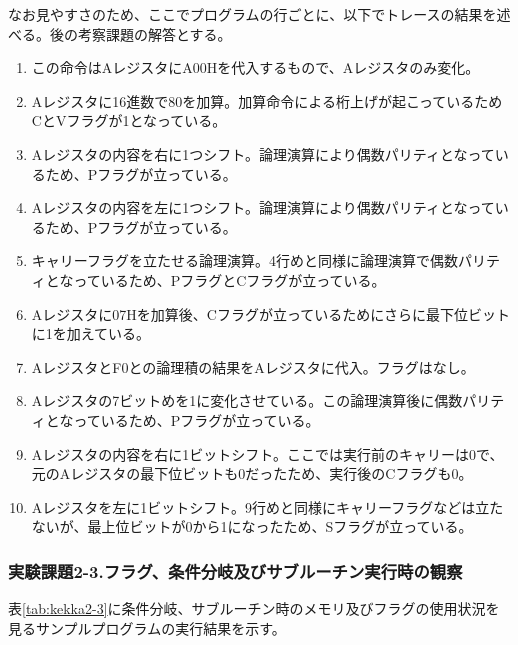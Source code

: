 \documentclass[11pt,a4j]{jsarticle}
\begin{document}
   なお見やすさのため、ここでプログラムの行ごとに、以下でトレースの結果を述べる。後の考察課題の解答とする。
   \begin{enumerate}
   \item この命令はAレジスタにA00Hを代入するもので、Aレジスタのみ変化。
   \item Aレジスタに16進数で80を加算。加算命令による桁上げが起こっているためCとVフラグが1となっている。
   \item Aレジスタの内容を右に1つシフト。論理演算により偶数パリティとなっているため、Pフラグが立っている。
   \item Aレジスタの内容を左に1つシフト。論理演算により偶数パリティとなっているため、Pフラグが立っている。
   \item キャリーフラグを立たせる論理演算。4行めと同様に論理演算で偶数パリティとなっているため、PフラグとCフラグが立っている。
   \item Aレジスタに07Hを加算後、Cフラグが立っているためにさらに最下位ビットに1を加えている。
   \item AレジスタとF0との論理積の結果をAレジスタに代入。フラグはなし。
   \item Aレジスタの7ビットめを1に変化させている。この論理演算後に偶数パリティとなっているため、Pフラグが立っている。
   \item Aレジスタの内容を右に1ビットシフト。ここでは実行前のキャリーは0で、元のAレジスタの最下位ビットも0だったため、実行後のCフラグも0。
   \item Aレジスタを左に1ビットシフト。9行めと同様にキャリーフラグなどは立たないが、最上位ビットが0から1になったため、Sフラグが立っている。
   \end{enumerate}
   
   \subsubsection{実験課題2-3.フラグ、条件分岐及びサブルーチン実行時の観察}
   
   表\ref{tab:kekka2-3}に条件分岐、サブルーチン時のメモリ及びフラグの使用状況を見るサンプルプログラムの実行結果を示す。
   
\end{document}
